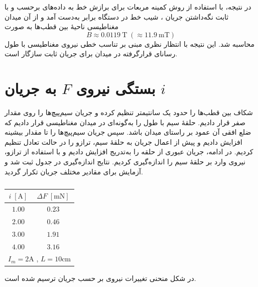 \documentclass[a4paper, 11pt]{article}
\begin{document}
در نتیجه، با استفاده از روش کمینه مربعات برای برازش خط به داده‌های  برحسب  و با ثابت نگه‌داشتن جریان ، شیب خط در دستگاه  برابر  به‌دست آمد و از آن میدان مغناطیسی ناحیهٔ بین قطب‌ها به صورت
\begin{equation}
B \approx 0.0119~\mathrm{T} \;(\approx 11.9~\mathrm{mT})
\end{equation}
محاسبه شد. این نتیجه با انتظار نظری مبنی بر تناسب خطی نیروی مغناطیسی با طول رسانای قرارگرفته در میدان برای جریان ثابت سازگار است.


\section{بستگی نیروی $F$ به جریان $i$}

شکاف بین قطب‌ها را حدود یک سانتیمتر تنظیم کرده و جریان سیم‌پیچ‌ها را روی مقدار صفر  قرار دادیم. حلقهٔ سیم با طول  را به‌گونه‌ای در میدان مغناطیسی قرار دادیم که ضلع افقی آن عمود بر راستای میدان باشد. سپس جریان سیم‌پیچ‌ها را تا مقدار بیشینه  افزایش دادیم و پیش از اعمال جریان به حلقهٔ سیم، ترازو را در حالت تعادل تنظیم کردیم. در ادامه، جریان عبوری از حلقه  را به‌تدریج افزایش دادیم و با استفاده از ترازو، نیروی وارد بر حلقهٔ سیم را اندازه‌گیری کردیم. نتایج اندازه‌گیری در جدول ثبت شد و آزمایش برای مقادیر مختلف جریان  تکرار گردید.

\begin{table}[h!]
\caption{}
\label{tab1}
\centering
\begin{tabular}{cc}
\hline
$i \;[\mathrm{A}]$ & $\Delta F \;[\mathrm{mN}]$ \\
\hline
$1.00$ & $0.23$ \\
$2.00$ & $0.46$ \\
$3.00$ & $1.91$ \\
$4.00$ & $3.16$ \\
\hline
\multicolumn{2}{c}{$I_m = 2\mathrm{A}$ , $L = 10 \mathrm{cm}$}
\end{tabular}
\end{table}

 در شکل منحنی تغییرات نیروی  بر حسب جریان  ترسیم شده است.
\end{document}
